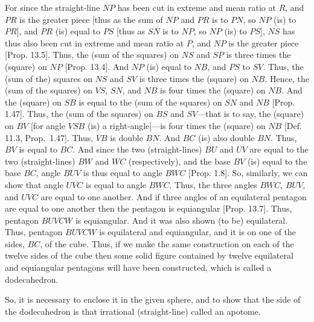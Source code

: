 \begin{Parallel}{}{}
{For since the straight-line $NP$ has been cut in extreme and mean ratio at
$R$, and $PR$ is the greater piece [thus as the sum of
$NP$ and $PR$ is to $PN$, so $NP$ (is) to $PR$], and $PR$
(is) equal to $PS$ [thus as $SN$ is to $NP$, so $NP$ (is) to $PS$], 
$NS$ has thus also been cut in extreme and mean ratio at $P$, and $NP$
is the greater piece [Prop. 13.5]. Thus, the (sum of the squares) on
$NS$ and $SP$ is three times the (square) on $NP$ [Prop. 13.4].
And $NP$ (is) equal to $NB$, and $PS$ to $SV$. Thus, the (sum of the)
squares on  $NS$ and $SV$ is three times the (square) on $NB$.
Hence, the (sum of the squares) on $VS$, $SN$, and $NB$
is four times the (square) on $NB$. And the (square) on $SB$
is equal to the (sum of the squares) on
$SN$ and $NB$  [Prop. 1.47].
Thus, the (sum of the squares) on $BS$ and $SV$---that is to say, 
the (square) on $BV$ [for angle $VSB$ (is) a right-angle]---is
four times the (square) on $NB$ [Def. 11.3, Prop.~1.47].
Thus, $VB$ is double $BN$. And $BC$ (is) also double $BN$.
Thus, $BV$ is equal to $BC$. And since the two (straight-lines)
$BU$ and $UV$ are equal to the two (straight-lines)
$BW$ and $WC$ (respectively), and the base $BV$ (is) equal to
the base $BC$, angle $BUV$ is thus equal to angle $BWC$ [Prop. 1.8].
So, similarly, we can show that angle $UVC$ is equal to angle
$BWC$.  Thus, the three angles
$BWC$, $BUV$, and $UVC$ are equal to one another.
And if three angles of an equilateral pentagon are equal to one another
then the pentagon is equiangular [Prop. 13.7].  Thus, pentagon
$BUVCW$ is equiangular. And it was also shown (to be)
equilateral. Thus, pentagon $BUVCW$ is equilateral and equiangular,
and it is on one of the sides, $BC$, of the cube. Thus, if we make the
same construction on each of the twelve sides of the cube then some solid
figure contained by twelve equilateral and equiangular pentagons 
will have been constructed,  which is called a dodecahedron.

So, it is necessary to enclose it in the given sphere, and to show that the
side of the dodecahedron is that irrational (straight-line) called an apotome.

}
\end{Parallel}
